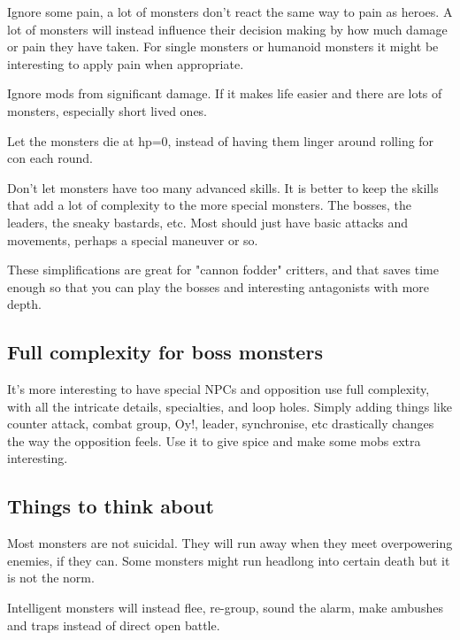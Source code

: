 Ignore some pain, a lot of monsters don't react the same way to pain as heroes. A lot of monsters will instead influence their decision making by how much damage or pain they have taken. For single monsters or humanoid monsters it might be interesting to apply pain when appropriate.

Ignore mods from significant damage. If it makes life easier and there are lots of monsters, especially short lived ones.

Let the monsters die at hp=0, instead of having them linger around rolling for con each round.

Don't let monsters have too many advanced skills. It is better to keep the skills that add a lot of complexity to the more special monsters. The bosses, the leaders, the sneaky bastards, etc. Most should just have basic attacks and movements, perhaps a special maneuver or so.

These simplifications are great for "cannon fodder" critters, and that saves time enough so that you can play the bosses and interesting antagonists with more depth.


\subsection*{Full complexity for boss monsters}
It's more interesting to have special NPCs and opposition use full complexity, with all the intricate details, specialties, and loop holes. Simply adding things like counter attack, combat group, Oy!, leader, synchronise, etc drastically changes the way the opposition feels. Use it to give spice and make some mobs extra interesting.


\subsection*{Things to think about}
Most monsters are not suicidal. They will run away when they meet overpowering enemies, if they can. Some monsters might run headlong into certain death but it is not the norm.

Intelligent monsters will instead flee, re-group, sound the alarm, make ambushes and traps instead of direct open battle.














